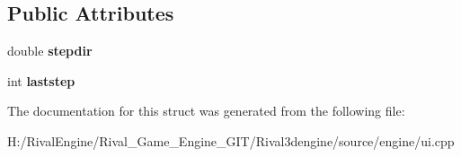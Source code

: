 \subsection*{Public Attributes}
\begin{DoxyCompactItemize}
\item 
\mbox{\label{struct_u_i_1_1_slider_arrow_a52cb59be6e9313a804fb59dde537b63d}} 
double {\bfseries stepdir}
\item 
\mbox{\label{struct_u_i_1_1_slider_arrow_a5261d4a2462a0b30025abd99a5d481de}} 
int {\bfseries laststep}
\end{DoxyCompactItemize}


The documentation for this struct was generated from the following file\+:\begin{DoxyCompactItemize}
\item 
H\+:/\+Rival\+Engine/\+Rival\+\_\+\+Game\+\_\+\+Engine\+\_\+\+G\+I\+T/\+Rival3dengine/source/engine/ui.\+cpp\end{DoxyCompactItemize}
